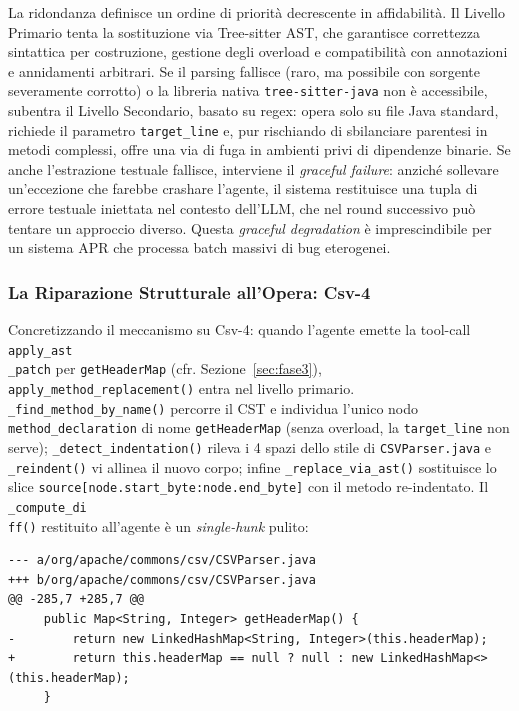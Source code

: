 La ridondanza definisce un ordine di priorità decrescente in affidabilità. Il Livello Primario tenta la
sostituzione via Tree-sitter AST, che garantisce correttezza sintattica per costruzione, gestione degli overload
e compatibilità con annotazioni e annidamenti arbitrari. Se il parsing fallisce (raro, ma possibile con sorgente
severamente corrotto) o la libreria nativa \texttt{tree-sitter-java} non è accessibile, subentra il Livello
Secondario, basato su regex: opera solo su file Java standard, richiede il parametro \texttt{target\_line} e, pur
rischiando di sbilanciare parentesi in metodi complessi, offre una via di fuga in ambienti privi di dipendenze
binarie. Se anche l'estrazione testuale fallisce, interviene il \textit{graceful failure}: anziché sollevare
un'eccezione che farebbe crashare l'agente, il sistema restituisce una tupla di errore testuale iniettata nel
contesto dell'LLM, che nel round successivo può tentare un approccio diverso. Questa \textit{graceful degradation}
è imprescindibile per un sistema APR che processa batch massivi di bug eterogenei.

\subsubsection{La Riparazione Strutturale all'Opera: Csv-4}
\label{subsubsec:3.4.6.8}
Concretizzando il meccanismo su Csv-4: quando l'agente emette la tool-call \texttt{apply\_ast\\\_patch} per
\texttt{getHeaderMap} (cfr. Sezione~\ref{sec:fase3}), \texttt{apply\_method\_replacement()} entra nel livello
primario. \texttt{\_find\_method\_by\_name()} percorre il CST e individua l'unico nodo
\texttt{method\_declaration} di nome \texttt{getHeaderMap} (senza overload, la \texttt{target\_line} non serve);
\texttt{\_detect\_indentation()} rileva i 4 spazi dello stile di \texttt{CSVParser.java} e \texttt{\_reindent()}
vi allinea il nuovo corpo; infine \texttt{\_replace\_via\_ast()} sostituisce lo slice
\texttt{source[node.start\_byte:node.end\_byte]} con il metodo re-indentato. Il \texttt{\_compute\_di\\ff()}
restituito all'agente è un \textit{single-hunk} pulito:

\begin{lstlisting}[label={lst:csv4_structural_diff}]
--- a/org/apache/commons/csv/CSVParser.java
+++ b/org/apache/commons/csv/CSVParser.java
@@ -285,7 +285,7 @@
     public Map<String, Integer> getHeaderMap() {
-        return new LinkedHashMap<String, Integer>(this.headerMap);
+        return this.headerMap == null ? null : new LinkedHashMap<>(this.headerMap);
     }
\end{lstlisting}

